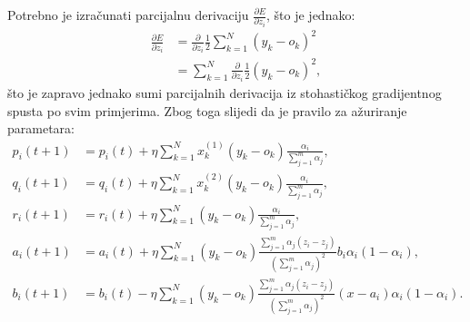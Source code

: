 \documentclass[12pt, a4paper, numeric]{article}
\begin{document}
Potrebno je izračunati parcijalnu derivaciju $\frac{\partial E}{\partial z_i}$, što je jednako:
\begin{equation*}
    \begin{split}
    \frac{\partial E}{\partial z_i} 
        &= \frac{\partial}{\partial z_i} \frac{1}{2}\sum_{k=1}^{N}(y_k - o_k)^2\\
        &= \sum_{k=1}^{N}\frac{\partial}{\partial z_i} \frac{1}{2}(y_k - o_k)^2,
    \end{split}
\end{equation*}
što je zapravo jednako sumi parcijalnih derivacija iz stohastičkog gradijentnog spusta po svim primjerima.
Zbog toga slijedi da je pravilo za ažuriranje parametara:
\begin{equation*}
    \begin{split}
        p_i(t + 1) &= p_i(t) + \eta\sum_{k=1}^{N} x_k^{(1)}(y_k - o_k)\frac{\alpha_i}{\sum_{j=1}^{m}\alpha_j},\\
        q_i(t + 1) &= q_i(t) + \eta\sum_{k=1}^{N} x_k^{(2)}(y_k - o_k)\frac{\alpha_i}{\sum_{j=1}^{m}\alpha_j},\\
        r_i(t + 1) &= r_i(t) + \eta\sum_{k=1}^{N}(y_k - o_k)\frac{\alpha_i}{\sum_{j=1}^{m}\alpha_j}, \\
        a_i(t+1) &= a_i(t) + \eta\sum_{k=1}^{N} (y_k - o_k) \frac{\sum_{j=1}^{m}\alpha_j(z_i-z_j)}{(\sum_{j=1}^{m}\alpha_j)^2} b_i\alpha_i (1 - \alpha_i), \\
        b_i(t+1) &= b_i(t) - \eta\sum_{k=1}^{N} (y_k - o_k) \frac{\sum_{j=1}^{m}\alpha_j(z_i-z_j)}{(\sum_{j=1}^{m}\alpha_j)^2} (x - a_i) \alpha_i (1 - \alpha_i).
    \end{split}
\end{equation*}
\end{document}

